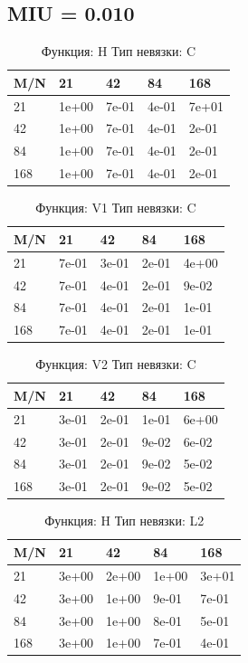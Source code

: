 \documentclass[a4paper,11pt]{article}
\begin{document}
\subsection{MIU = 0.010}
\begin{table}[H]
\caption {Функция: H Тип невязки: C   }
\begin{center}
\begin{tabular}{l|l|l|l|l}
\hline
M/N  & 21 & 42 & 84 & 168 \\ \hline
  21 & 1e+00& 7e-01& 4e-01& 7e+01\\ \hline
  42 & 1e+00& 7e-01& 4e-01& 2e-01\\ \hline
  84 & 1e+00& 7e-01& 4e-01& 2e-01\\ \hline
 168 & 1e+00& 7e-01& 4e-01& 2e-01\\ \hline
\end{tabular}
\end{center}
\end{table}
\begin{table}[H]
\caption {Функция: V1 Тип невязки: C   }
\begin{center}
\begin{tabular}{l|l|l|l|l}
\hline
M/N  & 21 & 42 & 84 & 168 \\ \hline
  21 & 7e-01& 3e-01& 2e-01& 4e+00\\ \hline
  42 & 7e-01& 4e-01& 2e-01& 9e-02\\ \hline
  84 & 7e-01& 4e-01& 2e-01& 1e-01\\ \hline
 168 & 7e-01& 4e-01& 2e-01& 1e-01\\ \hline
\end{tabular}
\end{center}
\end{table}
\begin{table}[H]
\caption {Функция: V2 Тип невязки: C   }
\begin{center}
\begin{tabular}{l|l|l|l|l}
\hline
M/N  & 21 & 42 & 84 & 168 \\ \hline
  21 & 3e-01& 2e-01& 1e-01& 6e+00\\ \hline
  42 & 3e-01& 2e-01& 9e-02& 6e-02\\ \hline
  84 & 3e-01& 2e-01& 9e-02& 5e-02\\ \hline
 168 & 3e-01& 2e-01& 9e-02& 5e-02\\ \hline
\end{tabular}
\end{center}
\end{table}
\begin{table}[H]
\caption {Функция: H Тип невязки: L2  }
\begin{center}
\begin{tabular}{l|l|l|l|l}
\hline
M/N  & 21 & 42 & 84 & 168 \\ \hline
  21 & 3e+00& 2e+00& 1e+00& 3e+01\\ \hline
  42 & 3e+00& 1e+00& 9e-01& 7e-01\\ \hline
  84 & 3e+00& 1e+00& 8e-01& 5e-01\\ \hline
 168 & 3e+00& 1e+00& 7e-01& 4e-01\\ \hline
\end{tabular}
\end{center}
\end{table}
\end{document}
